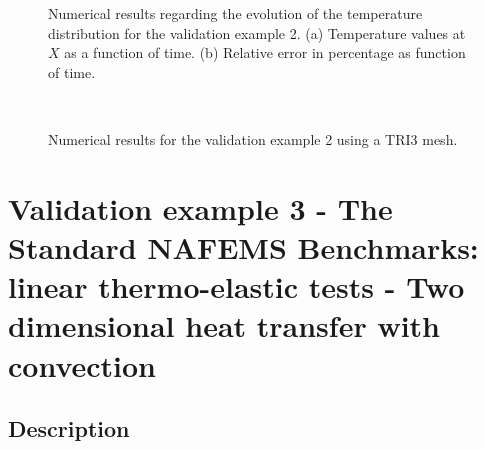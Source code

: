 \begin{figure}
   \centering
    \caption{Numerical results regarding the evolution of the temperature distribution for the validation example 2. (a) Temperature values at \(X\) as a function of time. (b) Relative error in percentage as function of time.}
    \label{fig:dim_example_2_comparison}
\end{figure}

\begin{figure}
   \centering
     \\
    \caption{Numerical results for the validation example 2 using a TRI3 mesh.}
    \label{fig:DIN_example_2_TRI3}
\end{figure}

\section{Validation example 3 - The Standard NAFEMS Benchmarks: linear thermo-elastic tests - Two dimensional heat transfer with convection}

\subsection{Description}

